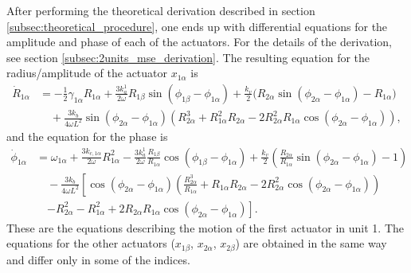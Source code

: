 \documentclass[11pt, a4paper]{article} %
\begin{document}
After performing the theoretical derivation described in section \ref{subsec:theoretical_procedure}, one ends up with 
differential equations for the amplitude and phase of each of the actuators. For the details of the derivation, 
see section \ref{subsec:2units_mse_derivation}. The resulting equation for the radius/amplitude of the actuator $x_{1\alpha}$ is
\begin{equation}
\begin{aligned}
\dot{R}_{1\alpha} &= -\frac{1}{2} \gamma_{1\alpha} R_{1\alpha} 
+ \frac{3k_a^{1}}{2\omega} R_{1\beta} \sin(\phi_{1\beta} - \phi_{1\alpha}) 
+ \frac{k_v}{2} \big(R_{2\alpha}\sin{(\phi_{2\alpha} - \phi_{1\alpha})} - R_{1\alpha}\big) \\
&\quad + \frac{3k_b}{4\omega L^2} \sin(\phi_{2\alpha} - \phi_{1\alpha}) 
\left( R_{2\alpha}^3 + R_{1\alpha}^2 R_{2\alpha} - 2R_{2\alpha}^2 R_{1\alpha} \cos(\phi_{2\alpha} - \phi_{1\alpha}) \right),
\label{eq_MSE_2nodes_amplitude}
\end{aligned}
\end{equation}
and the equation for the phase is
\begin{equation}
\begin{aligned}
\dot{\phi}_{1\alpha} &= \omega_{1\alpha} + \frac{3k_{c,1\alpha}}{2\omega} R_{1\alpha}^2 
- \frac{3k_a^{1}}{2\omega} \frac{R_{1\beta}}{R_{1\alpha}} \cos(\phi_{1\beta} - \phi_{1\alpha}) 
+ \frac{k_v}{2} \left(\frac{R_{2\alpha}}{R_{1\alpha}}\sin{(\phi_{2\alpha} - \phi_{1\alpha})} - 1\right) \\
&\quad - \frac{3k_b}{4\omega L^2} \left[ \cos(\phi_{2\alpha} - \phi_{1\alpha}) 
\left( \frac{R_{2\alpha}^3}{R_{1\alpha}} + R_{1\alpha} R_{2\alpha} - 2R_{2\alpha}^2 \cos(\phi_{2\alpha} - \phi_{1\alpha}) \right) \right. \\
&\quad \left. - R_{2\alpha}^2 - R_{1\alpha}^2 + 2R_{2\alpha} R_{1\alpha} \cos(\phi_{2\alpha} - \phi_{1\alpha}) \right].
\label{eq_MSE_2nodes_phase}
\end{aligned}
\end{equation}
These are the equations describing the motion of the first actuator in unit 1. 
The equations for the other actuators ($x_{1\beta}$, $x_{2\alpha}$, $x_{2\beta}$) are obtained in the same way and differ only in some of the indices. 
\end{document}
